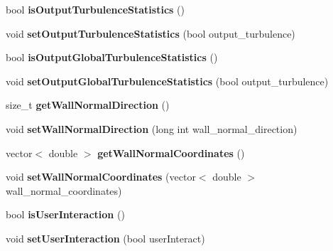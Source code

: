 \begin{DoxyCompactItemize}
\item 
\hypertarget{classnatrium_1_1SolverConfiguration_a4de0ef11cf54bbadd744c67db090c09d}{
bool {\bfseries isOutputTurbulenceStatistics} ()}
\label{classnatrium_1_1SolverConfiguration_a4de0ef11cf54bbadd744c67db090c09d}

\item 
\hypertarget{classnatrium_1_1SolverConfiguration_a9e16b95c4fcd4c30518d1ce6389c093d}{
void {\bfseries setOutputTurbulenceStatistics} (bool output\_\-turbulence)}
\label{classnatrium_1_1SolverConfiguration_a9e16b95c4fcd4c30518d1ce6389c093d}

\item 
\hypertarget{classnatrium_1_1SolverConfiguration_aff40727b3bc6a89d8096fe07f286371e}{
bool {\bfseries isOutputGlobalTurbulenceStatistics} ()}
\label{classnatrium_1_1SolverConfiguration_aff40727b3bc6a89d8096fe07f286371e}

\item 
\hypertarget{classnatrium_1_1SolverConfiguration_a244a09971cb400d5d7dc64a0b26344ba}{
void {\bfseries setOutputGlobalTurbulenceStatistics} (bool output\_\-turbulence)}
\label{classnatrium_1_1SolverConfiguration_a244a09971cb400d5d7dc64a0b26344ba}

\item 
\hypertarget{classnatrium_1_1SolverConfiguration_ae385a0869299d9cef472cce5170bdd30}{
size\_\-t {\bfseries getWallNormalDirection} ()}
\label{classnatrium_1_1SolverConfiguration_ae385a0869299d9cef472cce5170bdd30}

\item 
\hypertarget{classnatrium_1_1SolverConfiguration_afb4a6d67f7ad8ca10c52cecc87662909}{
void {\bfseries setWallNormalDirection} (long int wall\_\-normal\_\-direction)}
\label{classnatrium_1_1SolverConfiguration_afb4a6d67f7ad8ca10c52cecc87662909}

\item 
\hypertarget{classnatrium_1_1SolverConfiguration_a2bd29858bcdb09e68f33a6698d902a23}{
vector$<$ double $>$ {\bfseries getWallNormalCoordinates} ()}
\label{classnatrium_1_1SolverConfiguration_a2bd29858bcdb09e68f33a6698d902a23}

\item 
\hypertarget{classnatrium_1_1SolverConfiguration_a29be37fd46b043396635ea5f05aaf480}{
void {\bfseries setWallNormalCoordinates} (vector$<$ double $>$ wall\_\-normal\_\-coordinates)}
\label{classnatrium_1_1SolverConfiguration_a29be37fd46b043396635ea5f05aaf480}

\item 
\hypertarget{classnatrium_1_1SolverConfiguration_a6e41f8ce5da4ecafe2e4326997e79f3d}{
bool {\bfseries isUserInteraction} ()}
\label{classnatrium_1_1SolverConfiguration_a6e41f8ce5da4ecafe2e4326997e79f3d}

\item 
\hypertarget{classnatrium_1_1SolverConfiguration_ad013b9240ee7ae0d5cc43ff5f588c3f3}{
void {\bfseries setUserInteraction} (bool userInteract)}
\label{classnatrium_1_1SolverConfiguration_ad013b9240ee7ae0d5cc43ff5f588c3f3}

\end{DoxyCompactItemize}


